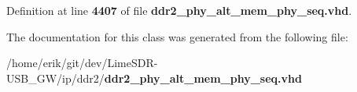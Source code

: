 Definition at line {\bf 4407} of file {\bf ddr2\+\_\+phy\+\_\+alt\+\_\+mem\+\_\+phy\+\_\+seq.\+vhd}.



The documentation for this class was generated from the following file\+:\begin{DoxyCompactItemize}
\item 
/home/erik/git/dev/\+Lime\+S\+D\+R-\/\+U\+S\+B\+\_\+\+G\+W/ip/ddr2/{\bf ddr2\+\_\+phy\+\_\+alt\+\_\+mem\+\_\+phy\+\_\+seq.\+vhd}\end{DoxyCompactItemize}
